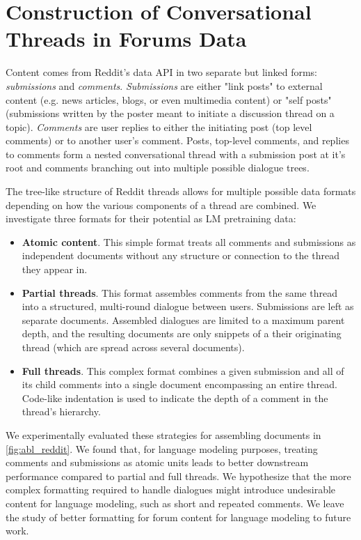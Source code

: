 \section{Construction of Conversational Threads in Forums Data} 
\label{sec:how-to-thread}


Content comes from Reddit's data API in two separate but linked forms: \textit{submissions} and \textit{comments}. \textit{Submissions} are either "link posts" to external content (e.g. news articles, blogs, or even multimedia content) or "self posts" (submissions written by the poster meant to initiate a discussion thread on a topic). \textit{Comments} are user replies to either the initiating post (top level comments) or to another user's comment. Posts, top-level comments, and replies to comments form a nested conversational thread with a submission post at it's root and comments branching out into multiple possible dialogue trees. 





The tree-like structure of Reddit threads allows for multiple possible data formats depending on how the various components of a thread are combined. 
We investigate three formats for their potential as LM pretraining data:
\begin{itemize}[leftmargin=1em]
    \item \textbf{Atomic content}. This simple format treats all comments and submissions as independent documents without any structure or connection to the thread they appear in.
    \item \textbf{Partial threads}. This format assembles comments from the same thread into a structured, multi-round dialogue between users. Submissions are left as separate documents. Assembled dialogues are limited to a maximum parent depth, and the resulting documents are only snippets of a their originating thread (which are spread across several documents).
    \item \textbf{Full threads}. This complex format combines a given submission and all of its child comments into a single document encompassing an entire thread. Code-like indentation is used to indicate the depth of a comment in the thread's hierarchy.
\end{itemize}


We experimentally evaluated these strategies for assembling documents in \autoref{fig:abl_reddit}. We found that, for language modeling purposes, treating comments and submissions as atomic units leads to better downstream performance compared to partial and full threads. 
We hypothesize that the more complex formatting required to handle dialogues might introduce undesirable content for language modeling, such as short and repeated comments. 
We leave the study of better formatting for forum content for language modeling to future work.
